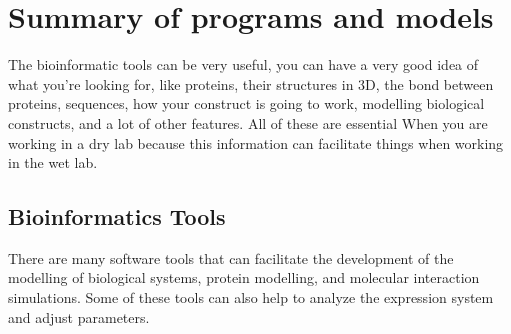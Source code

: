 \documentclass[11pt, letterpaper, english]{article}
\begin{document}
\newpage

\section{Summary of programs and models}
\par{The bioinformatic tools can be very useful, you can have a very good idea of what you’re looking for, like proteins, their structures in 3D, the bond between proteins, sequences, how your construct is going to work, modelling biological constructs, and a lot of other features. 
All of these are essential When you are working in a dry lab because this information can facilitate things when working in the wet lab.
}

\subsection{Bioinformatics Tools}
\par{There are many software tools that can facilitate the development of the modelling of biological systems, protein modelling, and molecular interaction simulations. Some of these tools can also help to analyze the expression system and adjust parameters.}
\end{document}
